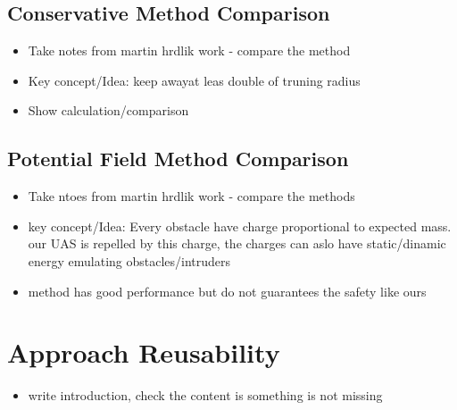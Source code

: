 \subsection{Conservative Method Comparison}\label{s:conservativeComparison}
\begin{itemize}
    \item Take notes from martin hrdlik work - compare the method 
    \item Key concept/Idea: keep awayat leas double of truning radius
    \item Show calculation/comparison
\end{itemize}

\subsection{Potential Field Method Comparison}\label{s:potentialComparison}
\begin{itemize}
    \item Take ntoes from martin hrdlik work - compare the methods
    \item key concept/Idea: Every obstacle have charge proportional to expected mass. our UAS is repelled by this charge, the charges can aslo have static/dinamic energy emulating obstacles/intruders
    \item method has good performance but do not guarantees the safety like ours
\end{itemize}

\section{Approach Reusability}\label{s:approachReusability}
\begin{itemize}
    \item write introduction, check the content is something is not missing
\end{itemize}
